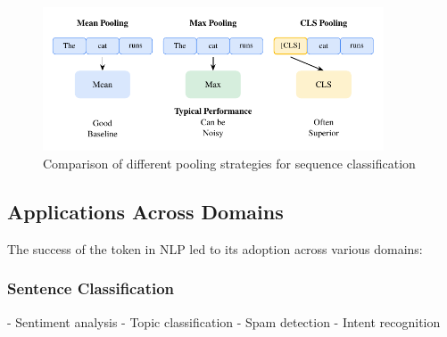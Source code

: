 \begin{figure}[h]
\centering
\includegraphics[width=0.9\textwidth]{part1/chapter02/fig_pooling_comparison.pdf}
\caption{Comparison of different pooling strategies for sequence classification}

\end{figure}

\subsection{Applications Across Domains}

The success of the \cls{} token in NLP led to its adoption across various domains:

\subsubsection{Sentence Classification}
- Sentiment analysis
- Topic classification  
- Spam detection
- Intent recognition


